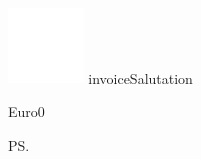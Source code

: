 \documentclass[a4paper]{scrlttr2}
\begin{document}
	\begin{letter}{\adressOne \\ 
	\customerStreet \\ \customerZIP \ \customerCity}
	
			\includegraphics[width=0.15\textwidth]{logo.png}	
			\ifcsname invoiceSalutation\endcsname
			\opening{\invoiceSalutation}
			\else
			\opening{ }
			\fi		
			\invoiceText
		    \begin{invoice}{Euro}{0}
			    
		    \end{invoice}
		\ps \invoiceHint
		
		\renewcommand*{\raggedsignature}{\raggedright} 
		\closing{\invoiceClosing}
		\invoiceEnclosures



	\end{letter}
\end{document}
